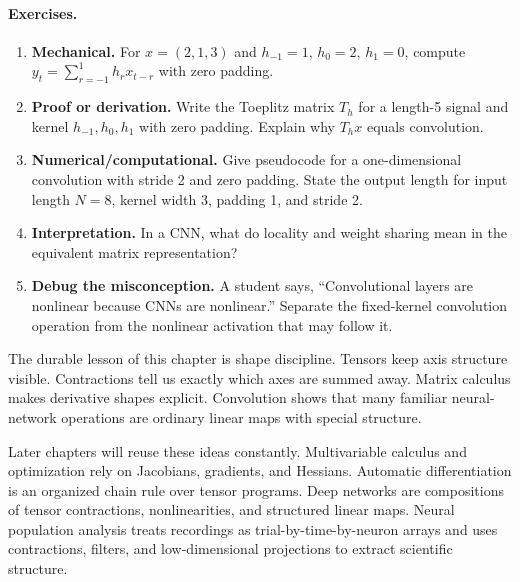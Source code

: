 \paragraph{Exercises.}
\begin{enumerate}[label=\textbf{7.4.\arabic*.}, leftmargin=*]
\item \textbf{Mechanical.} For \(x=(2,1,3)\) and \(h_{-1}=1\), \(h_0=2\), \(h_1=0\), compute \(y_t=\sum_{r=-1}^1 h_rx_{t-r}\) with zero padding.
\item \textbf{Proof or derivation.} Write the Toeplitz matrix \(T_h\) for a length-5 signal and kernel \(h_{-1},h_0,h_1\) with zero padding. Explain why \(T_hx\) equals convolution.
\item \textbf{Numerical/computational.} Give pseudocode for a one-dimensional convolution with stride 2 and zero padding. State the output length for input length \(N=8\), kernel width 3, padding 1, and stride 2.
\item \textbf{Interpretation.} In a CNN, what do locality and weight sharing mean in the equivalent matrix representation?
\item \textbf{Debug the misconception.} A student says, ``Convolutional layers are nonlinear because CNNs are nonlinear.'' Separate the fixed-kernel convolution operation from the nonlinear activation that may follow it.
\end{enumerate}

The durable lesson of this chapter is shape discipline. Tensors keep axis structure visible. Contractions tell us exactly which axes are summed away. Matrix calculus makes derivative shapes explicit. Convolution shows that many familiar neural-network operations are ordinary linear maps with special structure.

Later chapters will reuse these ideas constantly. Multivariable calculus and optimization rely on Jacobians, gradients, and Hessians. Automatic differentiation is an organized chain rule over tensor programs. Deep networks are compositions of tensor contractions, nonlinearities, and structured linear maps. Neural population analysis treats recordings as trial-by-time-by-neuron arrays and uses contractions, filters, and low-dimensional projections to extract scientific structure.

\clearpage
